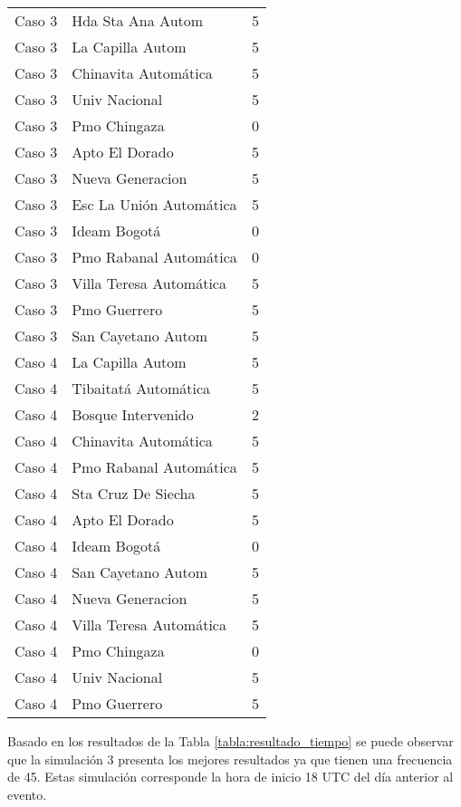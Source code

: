 \begin{longtable}{lll}
Caso 3 & Hda Sta Ana Autom  & 5\\
Caso 3 & La Capilla Autom  & 5\\
Caso 3 & Chinavita Automática  & 5\\
Caso 3 & Univ Nacional  & 5\\
Caso 3 & Pmo Chingaza  & 0\\
Caso 3 & Apto El Dorado  & 5\\
Caso 3 & Nueva Generacion  & 5\\
Caso 3 & Esc La Unión Automática & 5\\
Caso 3 & Ideam Bogotá  & 0\\
Caso 3 & Pmo Rabanal Automática   & 0\\
Caso 3 & Villa Teresa Automática  & 5\\
Caso 3 & Pmo Guerrero  & 5\\
Caso 3 & San Cayetano Autom   & 5\\
Caso 4 & La Capilla Autom  & 5\\
Caso 4 & Tibaitatá Automática  & 5\\
Caso 4 & Bosque Intervenido    & 2\\
Caso 4 & Chinavita Automática  & 5\\
Caso 4 & Pmo Rabanal Automática   & 5\\
Caso 4 & Sta Cruz De Siecha  & 5\\
Caso 4 & Apto El Dorado  & 5\\
Caso 4 & Ideam Bogotá  & 0\\
Caso 4 & San Cayetano Autom   & 5\\
Caso 4 & Nueva Generacion  & 5\\
Caso 4 & Villa Teresa Automática  & 5\\
Caso 4 & Pmo Chingaza  & 0\\
Caso 4 & Univ Nacional  & 5\\
Caso 4 & Pmo Guerrero  & 5\\


\end{longtable}


Basado en los resultados de la Tabla \ref{tabla:resultado_tiempo} se puede observar que la simulación 3 presenta los mejores resultados ya que tienen una frecuencia de 45. Estas simulación corresponde la hora de inicio 18 UTC del día anterior al evento.\\

